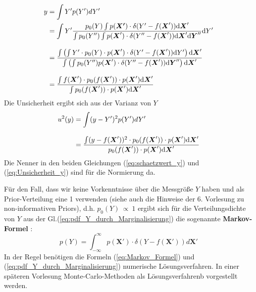\begin{align}
y &= \int Y' p(Y') dY' \nonumber\\ 
&=  \int Y'\frac{\textstyle p_0(Y) \int p(\boldsymbol{X'}) \cdot \delta(Y'-f(\boldsymbol{X}')) \mathrm{d} \boldsymbol{X}' }
{\textstyle \int p_0(Y'')\int  p(\boldsymbol{X}') \cdot \delta(Y''-f(\boldsymbol{X}')) \mathrm{d} \boldsymbol{X}'\mathrm{d} \boldsymbol{Y}'' } \mathrm{d} Y'  \nonumber \\[2ex]
&= \frac{\textstyle\int \left( \int Y' \cdot p_0(Y) \cdot p(\boldsymbol{X}') \cdot \delta(Y'-f(\boldsymbol{X}'))\mathrm{d}Y' \right) \mathrm{d} \boldsymbol{X}' }
{\textstyle \int \left(\int p_0(Y'') p(\boldsymbol{X}') \cdot \delta(Y''-f(\boldsymbol{X}')) \mathrm{d}  \boldsymbol{Y}'' \right) \mathrm{d} \boldsymbol{X}'}\nonumber \\[2ex]  
&=  \frac{\textstyle\int f(\boldsymbol{X}') \cdot p_0(f(\boldsymbol{X}')) \cdot p(\boldsymbol{X}')  \mathrm{d} \boldsymbol{X}' }
{\textstyle \int   p_0(f(\boldsymbol{X}')) \cdot p(\boldsymbol{X}') 
	\mathrm{d} \boldsymbol{X}'}  \label{eq:schaetzwert_y}
\end{align}
Die Unsicherheit ergibt sich aus der Varianz von $Y$  
\begin{align}
u^2(y) &= \int (y-Y')^2 p(Y') dY' \nonumber \\[2ex]
&= \frac{\textstyle \int (y-f(\boldsymbol{X}'))^2 \cdot p_0(f(\boldsymbol{X}'))
	\cdot p(\boldsymbol{X}') \mathrm{d} \boldsymbol{X}' }
{\textstyle p_0(f(\boldsymbol{X}')) \cdot p(\boldsymbol{X}') \mathrm{d} \boldsymbol{X}'}  
\label{eq:Unsicherheit_y}
\end{align}
Die Nenner in den beiden Gleichungen (\ref{eq:schaetzwert_y}) und
(\ref{eq:Unsicherheit_y}) sind für die Normierung da.

Für den Fall, dass wir keine Vorkenntnisse über die Messgröße $Y$
haben und als Prior-Verteilung eine 1 verwenden (siehe auch 
die Hinweise der 6. Vorlesung zu non-informativen Priors), d.h.
$p_0(Y)~\propto~1$ ergibt sich für die Verteilungsdichte von $Y$ aus
der Gl.(\ref{eq:pdf_Y_durch_Marginalisierung}) die sogenannte 
\textbf{Markov-Formel} \cite{Cox06}: 
\begin{equation}
p(Y) = \int_{-\infty}^{\infty} 
p(\boldsymbol{X}') \cdot \delta (Y-f(\boldsymbol{X}')) d \boldsymbol{X}'
\label{eq:Markov_Formel}
\end{equation}
In der Regel benötigen die Formeln (\ref{eq:Markov_Formel}) und (\ref{eq:pdf_Y_durch_Marginalisierung}) numerische Lösungsverfahren. In 
einer späteren Vorlesung Monte-Carlo-Methoden als Lösungsverfahrenb vorgestellt werden.

